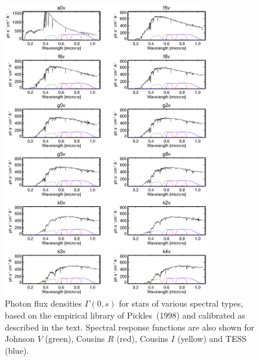 \documentclass[preprint,10pt]{aastex}
\begin{document}
\begin{figure}
\begin{center}
\includegraphics[width=0.8\textwidth]{pickles1.eps}
\end{center}
\caption{Photon flux densities $\Gamma(0,s)$ for stars of various
spectral types, based on the empirical library of Pickles~(1998) and
calibrated as described in the text. Spectral response functions are also shown
for Johnson $V$ (green), Cousins $R$ (red), Cousins $I$ (yellow)
and TESS (blue).}
\label{fig:pickles1}
\end{figure}
\end{document}
